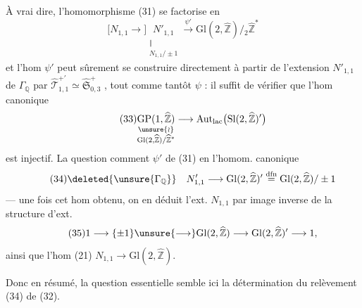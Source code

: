 À vrai dire, l'homomorphisme (31) se factorise en
\[
\tag{31}
\bigl[N_{1,1}\longrightarrow\bigr]
\underset{\substack{\Vert\\N_{1,1}/\pm1}}{N'_{1,1}}
\xrightarrow{\psi'}\mathrm{Gl}(2,\widehat{\mathbb Z})/{}_{2}\widehat{\mathbb Z}^{*}
\]
et l'hom $\psi'$ peut sûrement se construire directement à partir de l'extension
$N'_{1,1}$ de $\Gamma_{\mathbb Q}$ par
$\widehat{\mathcal T}_{1,1}^{+\prime}\simeq\widehat{\mathfrak S}_{0,3}^{+}$
, tout comme tantôt $\psi$ :
il suffit de vérifier que l'hom canonique
\[
\tag{33}
\underset{\substack{\unsure{\wr}\\\mathrm{Gl}(2,\widehat{\mathbb Z})/\widehat{\mathbb Z}^{*}}}{\mathrm{GP}(1,\widehat{\mathbb Z})}
\longrightarrow\mathrm{Aut}_{\mathrm{lac}}\bigl(\mathrm{Sl}(2,\widehat{\mathbb Z})'\bigr)
\]
est  injectif. La question 
comment 
$\psi'$ de (31) en l'homom. canonique
\[
\tag{34}
\deleted{\unsure{\Gamma_{\mathbb Q}}}\quad
N'_{1,1}\longrightarrow\mathrm{Gl}(2,\widehat{\mathbb Z})'
\overset{\mathrm{dfn}}{=}\mathrm{Gl}(2,\widehat{\mathbb Z})/\pm1
\]
--- une fois cet hom obtenu, on en déduit l'ext. $N_{1,1}$ par image inverse
de la structure d'ext.
\[
\tag{35}
1\longrightarrow\{\pm1\}\unsure{\longrightarrow}\mathrm{Gl}(2,\widehat{\mathbb Z})
\longrightarrow\mathrm{Gl}(2,\widehat{\mathbb Z})'\longrightarrow1,
\]
ainsi que l'hom (21) $N_{1,1}\longrightarrow\mathrm{Gl}(2,\widehat{\mathbb Z})$.



Donc en résumé, la question essentielle semble ici la détermination du relèvement (34) de (32).

